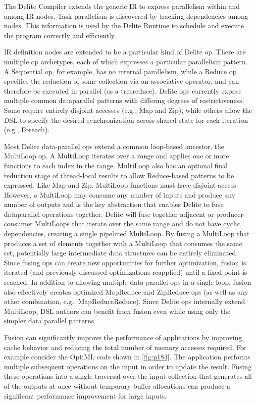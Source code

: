 The Delite Compiler extends the generic IR to express
parallelism within and among IR nodes. Task parallelism
is discovered by tracking dependencies among nodes. This
information is used by the Delite Runtime to schedule and
execute the program correctly and efficiently.

IR definition nodes are extended to be a particular kind of
Delite op. There are multiple op archetypes, each of which
expresses a particular parallelism pattern. A Sequential op,
for example, has no internal parallelism, while a Reduce op
specifies the reduction of some collection via an associative operator, and can therefore be executed in parallel (as a treereduce). Delite ops currently expose multiple common dataparallel patterns with differing degrees of restrictiveness. Some
require entirely disjoint accesses (e.g., Map and Zip), while
others allow the DSL to specify the desired synchronization
across shared state for each iteration (e.g., Foreach).

Most Delite data-parallel ops extend a common loop-based
ancestor, the MultiLoop op. A MultiLoop iterates over a
range and applies one or more functions to each index in
the range. MultiLoop also has an optional final reduction
stage of thread-local results to allow Reduce-based patterns to
be expressed. Like Map and Zip, MultiLoop functions must
have disjoint access. However, a MultiLoop may consume
any number of inputs and produce any number of outputs
and is the key abstraction that enables Delite to fuse dataparallel operations together. Delite will fuse together adjacent
or producer-consumer MultiLoops that iterate over the same
range and do not have cyclic dependencies, creating a single
pipelined MultiLoop. By fusing a MultiLoop that produces
a set of elements together with a MultiLoop that consumes
the same set, potentially large intermediate data structures
can be entirely eliminated. Since fusing ops can create new
opportunities for further optimization, fusion is iterated (and
previously discussed optimizations reapplied) until a fixed
point is reached. In addition to allowing multiple data-parallel
ops in a single loop, fusion also effectively creates optimized
MapReduce and ZipReduce ops (as well as any other combination, e.g., MapReduceReduce). Since Delite ops internally
extend MultiLoop, DSL authors can benefit from fusion even
while using only the simpler data parallel patterns.

Fusion can significantly improve the performance of applications by improving cache behavior and reducing the total
number of memory accesses required. For example consider
the OptiML code shown in \ref{fig:p184}. The application performs
multiple subsequent operations on the input in order to update
the result. Fusing these operations into a single traversal over
the input collection that generates all of the outputs at once
without temporary buffer allocations can produce a significant
performance improvement for large inputs.

